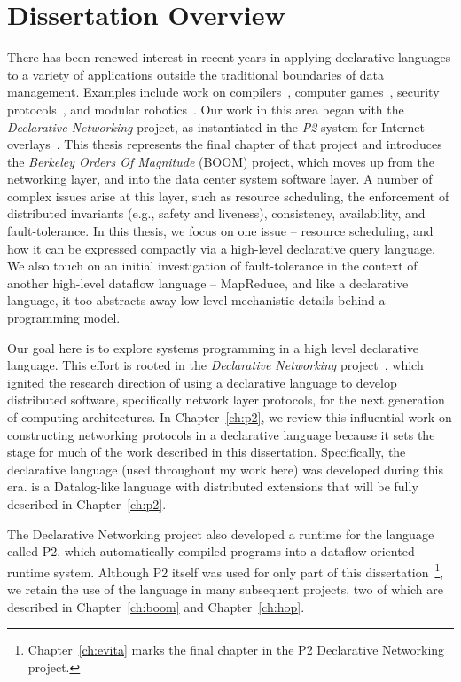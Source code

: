 \chapter[Dissertation Overview]{Dissertation Overview}
\label{ch:overview}

There has been renewed interest in recent years in applying declarative
languages to a variety of applications outside the traditional boundaries of
data management.  Examples include work on compilers~\cite{lam05context},
computer games~\cite{white-sigmod07}, security protocols~\cite{li-padl03}, and
modular robotics~\cite{ashley-iros07}.  Our work in this area began with the
{\em Declarative Networking} project, as instantiated in the {\em P2} system
for Internet overlays~\cite{p2:sosp, loo-sigmod06}.  This thesis represents the
final chapter of that project and introduces the {\em Berkeley Orders Of
Magnitude} (BOOM) project, which moves up from the networking layer, and into
the data center system software layer.  A number of complex issues arise at
this layer, such as resource scheduling, the enforcement of distributed
invariants (e.g., safety and liveness), consistency, availability, and
fault-tolerance.  In this thesis, we focus on one issue -- resource scheduling,
and how it can be expressed compactly via a high-level declarative query
language.  We also touch on an initial investigation of fault-tolerance in the
context of another high-level dataflow language -- MapReduce, and like a
declarative language, it too abstracts away low level mechanistic details
behind a programming model.  

Our goal here is to explore systems programming in a high level declarative
language.  This effort is rooted in the {\em Declarative Networking}
project~\cite{boon-thesis}, which ignited the research direction of using a
declarative language to develop distributed software, specifically network
layer protocols, for the next generation of computing architectures.  In
Chapter~\ref{ch:p2}, we review this influential work on constructing networking
protocols in a declarative language because it sets the stage for much of the
work described in this dissertation.  Specifically, the declarative language
\OVERLOG (used throughout my work here) was developed during this era.
\OVERLOG is a Datalog-like language with distributed extensions that will be
fully described in Chapter~\ref{ch:p2}.  

The Declarative Networking project also developed a runtime for the \OVERLOG
language called P2, which automatically compiled \OVERLOG programs into a
dataflow-oriented runtime system.  Although P2 itself was used for only part of
this dissertation~\footnote{Chapter~\ref{ch:evita} marks the final chapter in
the P2 Declarative Networking project.}, we retain the use of the \OVERLOG
language in many subsequent projects, two of which are described in
Chapter~\ref{ch:boom} and Chapter~\ref{ch:hop}.

